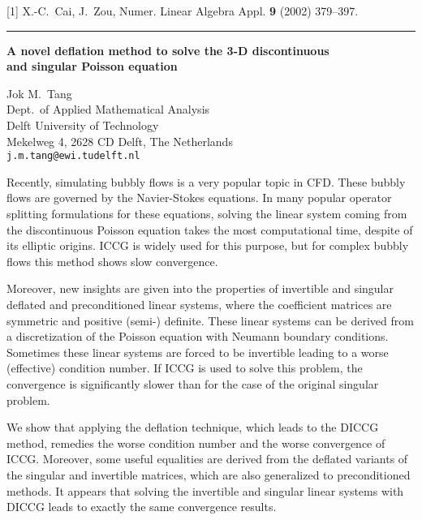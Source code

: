 \documentclass[twosided]{report}
\begin{document}
[1] X.-C.~Cai, J.~Zou,
Numer. Linear Algebra Appl. {\bf 9} (2002) 379--397.



	\begin{center} \rule{6in}{1pt} \end{center}

\begin{center}
{\large			%
{\bf A novel deflation method to solve the 3-D discontinuous \\
	and singular Poisson equation}}

	Jok M.~Tang \\
	Dept.~of Applied Mathematical Analysis \\
	Delft University of Technology \\
	Mekelweg 4, 2628 CD Delft, The Netherlands \\ 
	{\tt j.m.tang@ewi.tudelft.nl}
\end{center}
Recently, simulating bubbly flows is a very popular topic in
CFD. These bubbly flows are governed by the Navier-Stokes
equations. In many popular operator splitting formulations
for these equations, solving the linear system coming from
the discontinuous Poisson equation takes the most
computational time, despite of its elliptic origins. ICCG is
widely used for this purpose, but for complex bubbly flows
this method shows slow convergence.

Moreover, new insights are given into the properties of
invertible and singular deflated and preconditioned linear
systems, where the coefficient matrices are symmetric and
positive (semi-) definite. These linear systems can be
derived from a discretization of the Poisson equation with
Neumann boundary conditions. Sometimes these linear systems
are forced to be invertible leading to a worse (effective)
condition number. If ICCG is used to solve this problem, the
convergence is significantly slower than for the case of the
original singular problem.

We show that applying the deflation technique, which leads
to the DICCG method, remedies the worse condition number and
the worse convergence of ICCG. Moreover, some useful
equalities are derived from the deflated variants of the
singular and invertible matrices, which are also generalized
to preconditioned methods. It appears that solving the
invertible and singular linear systems with DICCG leads to
exactly the same convergence results.
\end{document}
